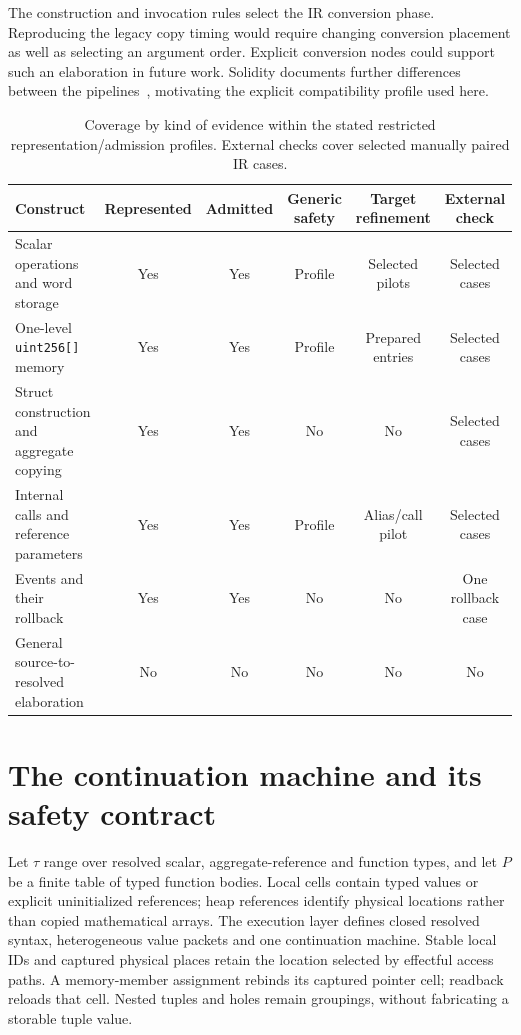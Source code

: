 \documentclass[conference]{IEEEtran}
\newcommand{\code}[1]{\texttt{#1}}
\begin{document}
The construction and invocation rules select the IR conversion phase.
Reproducing the legacy copy timing would require changing conversion placement
as well as selecting an argument order. Explicit conversion nodes could support
such an elaboration in future work. Solidity documents further differences
between the pipelines~\cite{ir-changes}, motivating the explicit compatibility
profile used here.

\begin{table}[t]
\centering
\caption{Coverage by kind of evidence within the stated restricted
representation/admission profiles.
External checks cover selected manually paired IR cases.}
\label{tab:coverage}
\small
\begin{tabularx}{\textwidth}{@{}Xccccc@{}}
\toprule
Construct & Represented & Admitted & Generic safety & Target refinement & External check\\
\midrule
Scalar operations and word storage & Yes & Yes & Profile & Selected pilots & Selected cases\\
One-level \code{uint256[]} memory & Yes & Yes & Profile & Prepared entries & Selected cases\\
Struct construction and aggregate copying & Yes & Yes & No & No & Selected cases\\
Internal calls and reference parameters & Yes & Yes & Profile & Alias/call pilot & Selected cases\\
Events and their rollback & Yes & Yes & No & No & One rollback case\\
General source-to-resolved elaboration & No & No & No & No & No\\
\bottomrule
\end{tabularx}
\end{table}

\section{The continuation machine and its safety contract}
\label{sec:execution}
Let $\tau$ range over resolved scalar, aggregate-reference and function types,
and let $P$ be a finite table of typed function bodies. Local cells contain typed
values or explicit uninitialized references; heap references identify physical
locations rather than copied mathematical arrays. The execution layer defines
closed resolved syntax, heterogeneous
value packets and one continuation machine. Stable local IDs and captured
physical places retain the location selected by effectful access paths. A
memory-member assignment rebinds its captured pointer cell; readback reloads
that cell. Nested tuples and holes remain groupings, without fabricating a
storable tuple value.
\end{document}
